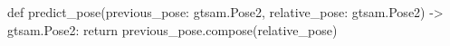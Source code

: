 \begin{pythoncode}
def predict_pose(previous_pose: gtsam.Pose2, relative_pose: gtsam.Pose2) -> gtsam.Pose2:
    return previous_pose.compose(relative_pose)
\end{pythoncode}
